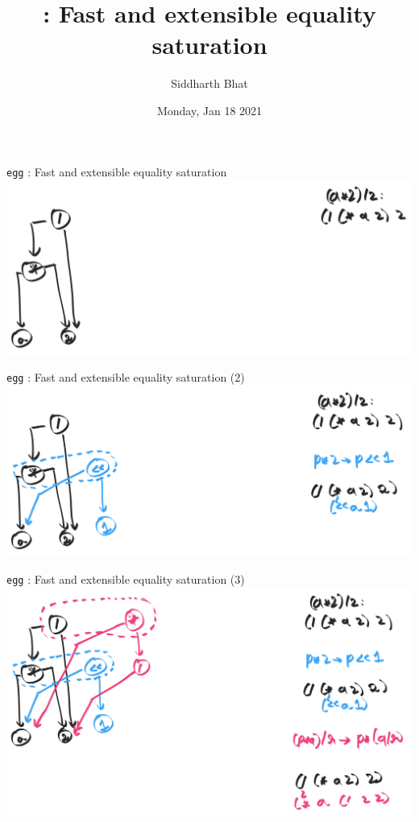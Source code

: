\documentclass[8pt]{beamer}
\author{Siddharth Bhat}
\date{Monday, Jan 18 2021}
\title{\egg: Fast and extensible equality saturation}
\newcommand{\egg}{\texttt{egg} }
\begin{document}
\maketitle

\begin{frame}[fragile]{\egg: Fast and extensible equality saturation}
\includegraphics[width=\textwidth]{./eg-1-1.png}
\end{frame}

\begin{frame}[fragile]{\egg: Fast and extensible equality saturation (2)}
\includegraphics[width=\textwidth]{./eg-1-2.png}
\end{frame}


\begin{frame}[fragile]{\egg: Fast and extensible equality saturation (3)}
\includegraphics[width=\textwidth]{./eg-1-3.png}
\end{frame}
\end{document}
